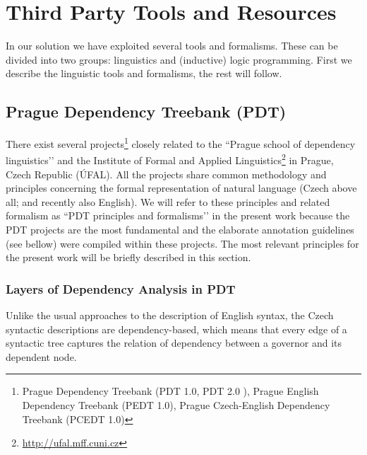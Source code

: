 \chapter{Third Party Tools and Resources}

\graphicspath{{../img/ch30/}}


In our solution we have exploited several tools and formalisms. These can be divided into two groups: linguistics and (inductive) logic programming. First we describe the linguistic tools and formalisms, the rest will follow.



\section{Prague Dependency Treebank (PDT)} \label{sec:ch30_pdt}
There exist several projects\footnote{Prague Dependency Treebank
 (PDT 1.0, PDT 2.0 \citep{biblio:PDT20_CD}), Prague English Dependency Treebank (PEDT 1.0), Prague Czech-English Dependency Treebank (PCEDT 1.0)} 
closely related to the ``Prague school of dependency linguistics’’ and the Institute of Formal and Applied Linguistics\footnote{\url{http://ufal.mff.cuni.cz}} in Prague, Czech Republic (ÚFAL). All the projects share common methodology and principles concerning the formal representation of natural language (Czech above all; and recently also English). We will refer to these principles and related formalism as ``PDT principles and formalisms’’ in the present work because the PDT projects are the most fundamental and the elaborate annotation guidelines (see bellow) were compiled within these projects. The most relevant principles for the present work will be briefly described in this section.

\subsection{Layers of Dependency Analysis in PDT}

Unlike the usual approaches to the description of English syntax, the Czech syntactic descriptions are dependency-based, which means that every edge of a syntactic tree captures the relation of dependency between a governor and its dependent node. 

